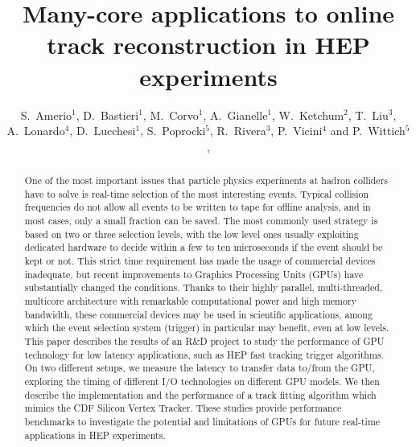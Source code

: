 \documentclass[letterpaper]{jpconf}
\begin{document}
\title{Many-core applications to online track reconstruction in HEP experiments}
\author{S.~Amerio$^1$, 
  D.~Bastieri$^1$, 
  M.~Corvo$^1$, 
  A.~Gianelle$^1$, 
  W.~Ketchum$^2$,
  T.~Liu$^3$, 
  A.~Lonardo$^4$, 
  D.~Lucchesi$^1$,
  S.~Poprocki$^5$, 
  R.~Rivera$^3$, 
  P.~Vicini$^4$
  and 
  P.~Wittich$^5$,
}
\address{$^1$ INFN and University of Padova, Italy}
\address{$^2$ Los Alamos National Laboratory, New Mexico, USA}
\address{$^3$ Fermi National Accelerator Laboratory, Illinois, USA}
\address{$^4$ INFN Roma, Italy}
\address{$^5$ Cornell University, New York, USA}


\begin{abstract}
  One of the most important issues that particle physics experiments
  at hadron colliders have to solve is real-time selection of the most
  interesting events. Typical collision frequencies do not allow all
  events to be written to tape for offline analysis, and in most
  cases, only a small fraction can be saved. The most commonly used
  strategy is based on two or three selection levels, with the low
  level ones usually exploiting dedicated hardware to decide within a
  few to ten microseconds if the event should be kept or not. This
  strict time requirement has made the usage of commercial devices
  inadequate, but recent improvements to Graphics Processing Units
  (GPUs) have substantially changed the conditions. Thanks to their
  highly parallel, multi-threaded, multicore architecture with
  remarkable computational power and high memory bandwidth, these
  commercial devices may be used in scientific applications, among
  which the event selection system (trigger) in particular may
  benefit, even at low levels. This paper describes the results of an
  R\&D project to study the performance of GPU technology for low
  latency applications, such as HEP fast tracking trigger algorithms.
  On two different setups, we measure the latency to transfer data
  to/from the GPU, exploring the timing of different I/O technologies
  on different GPU models. We then describe the implementation and the
  performance of a track fitting algorithm which mimics the CDF
  Silicon Vertex Tracker.  These studies provide performance
  benchmarks to investigate the potential and limitations of GPUs for
  future real-time applications in HEP experiments.
\end{abstract}
\end{document}
